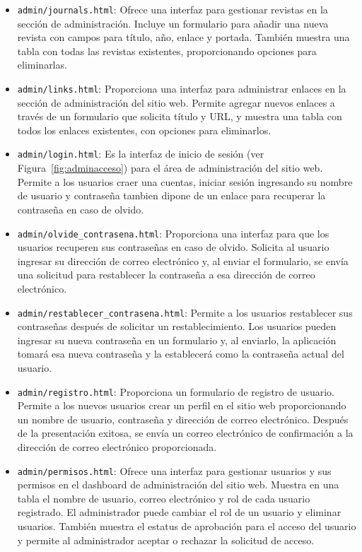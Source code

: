 \documentclass[a4paper, 12pt]{book}
\begin{document}
\begin{itemize}
  \item \texttt{admin/journals.html}: Ofrece una interfaz para gestionar revistas en la sección de administración. Incluye un formulario para añadir una nueva revista con campos para título, año, enlace y portada. También muestra una tabla con todas las revistas existentes, proporcionando opciones para eliminarlas.
  \item \texttt{admin/links.html}: Proporciona una interfaz para administrar enlaces en la sección de administración del sitio web. Permite agregar nuevos enlaces a través de un formulario que solicita título y URL, y muestra una tabla con todos los enlaces existentes, con opciones para eliminarlos.
  \item \texttt{admin/login.html}: Es la interfaz de inicio de sesión (ver Figura~\ref{fig:adminacceso}) para el área de administración del sitio web. Permite a los usuarios craer una cuentas, iniciar sesión ingresando su nombre de usuario y contraseña tambien dipone de un enlace para recuperar la contraseña en caso de olvido.
  \item \texttt{admin/olvide\_contrasena.html}: Proporciona una interfaz para que los usuarios recuperen sus contraseñas en caso de olvido. Solicita al usuario ingresar su dirección de correo electrónico y, al enviar el formulario, se envía una solicitud para restablecer la contraseña a esa dirección de correo electrónico.
  \item \texttt{admin/restablecer\_contrasena.html}: Permite a los usuarios restablecer sus contraseñas después de solicitar un restablecimiento. Los usuarios pueden ingresar su nueva contraseña en un formulario y, al enviarlo, la aplicación tomará esa nueva contraseña y la establecerá como la contraseña actual del usuario.
  \item \texttt{admin/registro.html}: Proporciona un formulario de registro de usuario. Permite a los nuevos usuarios crear un perfil en el sitio web proporcionando un nombre de usuario, contraseña y dirección de correo electrónico. Después de la presentación exitosa, se envía un correo electrónico de confirmación a la dirección de correo electrónico proporcionada.
  \item \texttt{admin/permisos.html}: Ofrece una interfaz para gestionar usuarios y sus permisos en el dashboard de administración del sitio web. Muestra en una tabla el nombre de usuario, correo electrónico y rol de cada usuario registrado. El administrador puede cambiar el rol de un usuario y eliminar usuarios. También muestra el estatus de aprobación para el acceso del usuario y permite al administrador aceptar o rechazar la solicitud de acceso.
\end{itemize}
\end{document}
